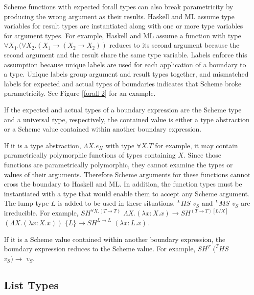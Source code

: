 Scheme functions with expected forall types can also break parametricity by producing the wrong argument as their results.  Haskell and ML assume type variables for result types are instantiated along with one or more type variables for argument types.  For example, Haskell and ML assume a function with type $\forall X_{1}.(\forall X_{2}.(X_{1}\rightarrow(X_{2}\rightarrow X_{2}))$ reduces to its second argument because the second argument and the result share the same type variable.  Labels enforce this assumption because unique labels are used for each application of a boundary to a type.  Unique labels group argument and result types together, and mismatched labels for expected and actual types of boundaries indicates that Scheme broke parametricity.  See Figure \ref{forall-2} for an example.



If the expected and actual types of a boundary expression are the Scheme type and a universal type, respectively, the contained value is either a type abstraction or a Scheme value contained within another boundary expression.

If it is a type abstraction, $\Lambda X.e_{H}$ with type $\forall X.T$ for example, it may contain parametrically polymorphic functions of types containing $X$.  Since those functions are parametrically polymorphic, they cannot examine the types or values of their arguments.  Therefore Scheme arguments for these functions cannot cross the boundary to Haskell and ML.  In addition, the function types must be instantiated with a type that would enable them to accept any Scheme argument.  The lump type $L$ is added to be used in these situations.  $^{L}HS$ $v_{S}$ and $^{L}MS$ $v_{S}$ are irreducible.  For example, $SH^{\forall X.(T\rightarrow T)}$ $\Lambda X.(\lambda x:X.x)\rightarrow SH^{(T\rightarrow T)[L/X]}$ $(\Lambda X.(\lambda x:X.x))$ $\lbrace L\rbrace\rightarrow SH^{L\rightarrow L}$ $(\lambda x:L.x)$.

If it is a Scheme value contained within another boundary expression, the boundary expression reduces to the Scheme value.  For example, $SH^{T}$ $(^{T}HS$ $v_{S})\rightarrow$ $v_{S}$.

\subsection{List Types}

